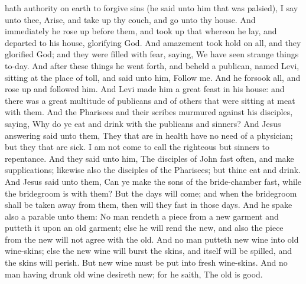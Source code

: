 hath authority on earth to forgive sins (he said unto him that was palsied), I say unto thee, Arise, and take up thy couch, and go unto thy house. And immediately he rose up before them, and took up that whereon he lay, and departed to his house, glorifying God. And amazement took hold on all, and they glorified God; and they were filled with fear, saying, We have seen strange things to-day.  And after these things he went forth, and beheld a publican, named Levi, sitting at the place of toll, and said unto him, Follow me. And he forsook all, and rose up and followed him.  And Levi made him a great feast in his house: and there was a great multitude of publicans and of others that were sitting at meat with them. And the Pharisees and their scribes murmured against his disciples, saying, Why do ye eat and drink with the publicans and sinners? And Jesus answering said unto them, They that are in health have no need of a physician; but they that are sick. I am not come to call the righteous but sinners to repentance.  And they said unto him, The disciples of John fast often, and make supplications; likewise also the disciples of the Pharisees; but thine eat and drink. And Jesus said unto them, Can ye make the sons of the bride-chamber fast, while the bridegroom is with them? But the days will come; and when the bridegroom shall be taken away from them, then will they fast in those days. And he spake also a parable unto them: No man rendeth a piece from a new garment and putteth it upon an old garment; else he will rend the new, and also the piece from the new will not agree with the old. And no man putteth new wine into old wine-skins; else the new wine will burst the skins, and itself will be spilled, and the skins will perish. But new wine must be put into fresh wine-skins. And no man having drunk old wine desireth new; for he saith, The old is good. 

